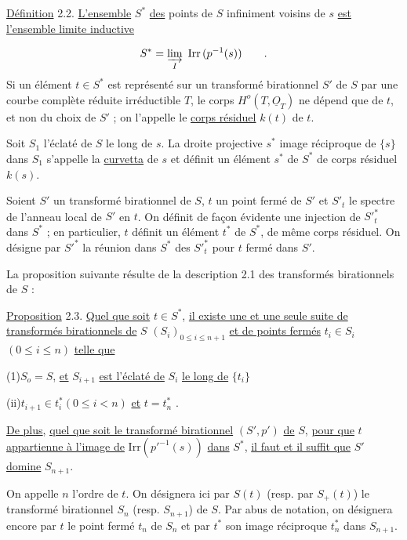 \underline{Définition} 2.2. \underline{L'ensemble} $S^*$ \underline{des} points de $S$ infiniment voisins de $s$ \underline{est} \underline{l'ensemble limite inductive}

\begin{equation*}
S^* = \varinjlim_{I} \ \mathrm{Irr}\,(p^{-1}(s)) \qquad .
\end{equation*}
Si un élément $t \in S^*$ est représenté sur un transformé birationnel $S'$ de $S$ par une courbe complète réduite irréductible $T$, le corps $H^o(T,\underline{O}_T)$ ne dépend que de $t$, et non du choix de $S'$ ; on l'appelle le \underline{corps résiduel} $k(t)$ de $t$.

Soit $S_1$ l'éclaté de $S$ le long de $s$. La droite projective $s^*$ image réciproque de $\{s\}$ dans $S_1$ s'appelle la \underline{curvetta} de $s$ et définit un élément $s^*$ de $S^*$ de corps résiduel $k(s)$.

Soient $S'$ un transformé birationnel de $S$, $t$ un point fermé de $S'$ et $S'_t$ le spectre de l'anneau local de $S'$ en $t$. On définit de façon évidente une injection de ${S'}^*_t$ dans $S^*$ ; en particulier, $t$ définit un élément $t^*$ de $S^*$, de même corps résiduel. On désigne par ${S'}^*$ la réunion dans $S^*$ des ${S'}^*_t$ pour $t$ fermé dans $S'$.

La proposition suivante résulte de la description 2.1 des transformés birationnels de $S$ :



\underline{Proposition} 2.3. \underline{Quel que soit} $t \in S^*$, \underline{il existe une et une seule suite de transformés birationnels de} $S$ $(S_i)_{0 \leqslant i \leqslant n+1}$ \underline{et de points fermés} $t_i \in S_i$ $(0 \leqslant i \leqslant n)$ \underline{telle que}

(1)\quad $S_o = S$, \underline{et} $S_{i+1}$ \underline{est l'éclaté de} $S_i$ \underline{le long de} $\{t_i\}$

(ii)\quad $t_{i+1} \in t_i^*$\quad $(0 \leqslant i < n)$ \underline{et} $t = t_n^*$ .

\underline{De plus}, \underline{quel que soit le transformé birationnel} $(S',p')$ \underline{de} $S$, \underline{pour que} $t$ \underline{appartienne à l'image de} $\mathrm{Irr}({p'}^{-1}(s))$ \underline{dans} $S^*$, \underline{il faut et il suffit que} $S'$ \underline{domine} $S_{n+1}$.

On appelle $n$ l'ordre de $t$. On désignera ici par $S(t)$ (resp. par $S_+(t)$) le transformé birationnel $S_n$ (resp. $S_{n+1}$) de $S$. Par abus de notation, on désignera encore par $t$ le point fermé $t_n$ de $S_n$ et par $t^*$ son image réciproque $t_n^*$ dans $S_{n+1}$.

